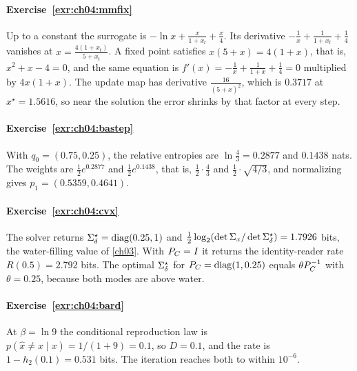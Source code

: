 \paragraph{Exercise~\ref{exr:ch04:mmfix}}
Up to a constant the surrogate is $-\ln x+\frac{x}{1+x_t}+\frac x4$. Its derivative $-\frac1x+\frac1{1+x_t}+\frac14$ vanishes at $x=\frac{4(1+x_t)}{5+x_t}$. A fixed point satisfies $x(5+x)=4(1+x)$, that is, $x^2+x-4=0$, and the same equation is $f'(x)=-\frac1x+\frac1{1+x}+\frac14=0$ multiplied by $4x(1+x)$. The update map has derivative $\frac{16}{(5+x)^2}$, which is $0.3717$ at $x^\star=1.5616$, so near the solution the error shrinks by that factor at every step.

\paragraph{Exercise~\ref{exr:ch04:bastep}}
With $q_0=(0.75,0.25)$, the relative entropies are $\ln\frac43=0.2877$ and $0.1438$ nats. The weights are $\frac12e^{0.2877}$ and $\frac12e^{0.1438}$, that is, $\frac12\cdot\frac43$ and $\frac12\cdot\sqrt{4/3}$, and normalizing gives $p_1=(0.5359,0.4641)$.

\paragraph{Exercise~\ref{exr:ch04:cvx}}
The solver returns $\Sigma_\delta^\star=\operatorname{diag}(0.25,1)$ and $\frac12\log_2(\det\Sigma_x/\det\Sigma_\delta^\star)=1.7926$ bits, the water-filling value of \cref{ch03}. With $P_C=I$ it returns the identity-reader rate $R(0.5)=2.792$ bits. The optimal $\Sigma_\delta^\star$ for $P_C=\operatorname{diag}(1,0.25)$ equals $\theta P_C^{-1}$ with $\theta=0.25$, because both modes are above water.

\paragraph{Exercise~\ref{exr:ch04:bard}}
At $\beta=\ln9$ the conditional reproduction law is $p(\hat x\ne x\mid x)=1/(1+9)=0.1$, so $D=0.1$, and the rate is $1-h_2(0.1)=0.531$ bits. The iteration reaches both to within $10^{-6}$.
